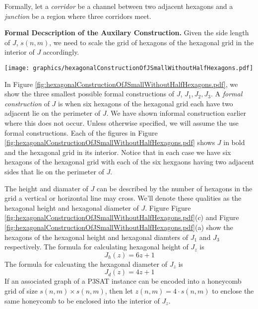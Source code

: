 \documentclass[10pt]{CSUNthesis}
\theoremstyle{plain}%
\theoremstyle{definition}
\theoremstyle{remark}
\begin{document}
Formally, let a \textit{corridor} be a channel between two adjacent hexagons and a \textit{junction} be a region where three corridors meet.

\textbf{Formal Decscription of the Auxilary Construction.}
Given the side length of $J$, $s(n,m)$, we need to scale the grid of hexagons of the hexagonal grid in the interior of $J$ accordingly.

\begin{minipage}{\linewidth}
\begin{center}
\texttt{[image: graphics/hexagonalConstructionOfJSmallWithoutHalfHexagons.pdf]}
\label{fig:hexagonalConstructionOfJSmallWithoutHalfHexagons.pdf}
\end{center}
\end{minipage}

In Figure \ref{fig:hexagonalConstructionOfJSmallWithoutHalfHexagons.pdf}, we show the three smallest possible formal constructions of $J$, $J_1, J_2, J_3$.  
A \textit{formal construction} of $J$ is when six hexagons of the hexagonal grid each have two adjacent lie on the perimeter of $J$.
We have shown informal construction earlier where this does not occur.
Unless otherwise specified, we will assume the use formal constructions.
Each of the figures in Figure \ref{fig:hexagonalConstructionOfJSmallWithoutHalfHexagons.pdf} shows $J$ in bold and the hexagonal grid in its interior.
Notice that in each case we have six hexagons of the hexagonal grid with each of the six hexgaons having two adjacent sides that lie on the perimeter of $J$.

The height and diamater of $J$ can be described by the number of hexagons in the grid a vertical or horizontal line may cross. 
We'll denote these qualities as the hexagonal height and hexagonal diameter of $J$.
Figure Figure \ref{fig:hexagonalConstructionOfJSmallWithoutHalfHexagons.pdf}(c) and Figure \ref{fig:hexagonalConstructionOfJSmallWithoutHalfHexagons.pdf}(a) show the hexagons of the hexagonal height and hexagonal diamters of $J_1$ and $J_3$ respectively.  
The formula for calculating hexagonal height of $J_z$ is 
\begin{equation}\label{eqn:Jh}
J_h (z) = 6z+1
\end{equation}
The formula for calcuating the hexagonal diameter of $J_z$ is 
\begin{equation}\label{eqn:Jd}
J_d (z) = 4z+1
\end{equation}
If an associated graph of a P3SAT instance can be encoded into a honeycomb grid of size $s(n,m) \times s(n,m)$, then let $z(n,m)=4\cdot s(n,m)$ to enclose the same honeycomb to be enclosed into the interior of $J_z$.
\end{document}
